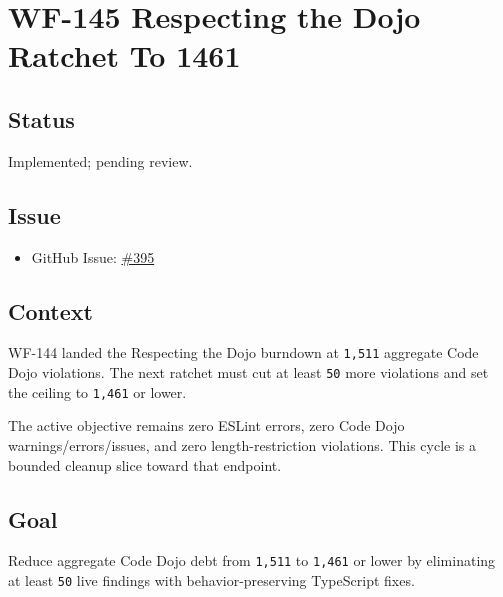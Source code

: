 \chapter{WF-145 Respecting the Dojo Ratchet To 1461}\label{record-227}

\smallskip

\section{Status}\label{record-227-status}

Implemented; pending review.

\section{Issue}\label{record-227-issue}

\begin{itemize}
\tightlist
\item
  GitHub Issue: \href{https://github.com/flyingrobots/bijou/issues/395}{\#395}
\end{itemize}

\section{Context}\label{record-227-context}

WF-144 landed the Respecting the Dojo burndown at \texttt{1\allowbreak{},\allowbreak{}5\allowbreak{}1\allowbreak{}1} aggregate Code Dojo violations. The next ratchet must cut at least \texttt{5\allowbreak{}0} more violations and set the ceiling to \texttt{1\allowbreak{},\allowbreak{}4\allowbreak{}6\allowbreak{}1} or lower.

The active objective remains zero ESLint errors, zero Code Dojo warnings/errors/issues, and zero length-restriction violations. This cycle is a bounded cleanup slice toward that endpoint.

\section{Goal}\label{record-227-goal}

Reduce aggregate Code Dojo debt from \texttt{1\allowbreak{},\allowbreak{}5\allowbreak{}1\allowbreak{}1} to \texttt{1\allowbreak{},\allowbreak{}4\allowbreak{}6\allowbreak{}1} or lower by eliminating at least \texttt{5\allowbreak{}0} live findings with behavior-preserving TypeScript fixes.

